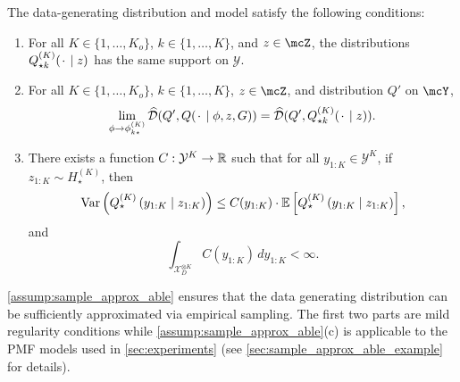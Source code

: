 \begin{assumption}\label{assump:sample_approx_able}
  The data-generating distribution and model satisfy the following conditions: 
	\begin{enumerate}[label={(\alph*)}]
\item For all $K \in \{1,\dots,K_{o}\}$, $k \in \{1,\dots,K\}$, and $z \in \mcZ$, 
the distributions $Q^{(K)}_{\star k}({\mkern 2mu\cdot\mkern 2mu}\mid z)$ has the same support on $\mathcal{Y}$.
    \item For all $K \in \{1,\dots,K_{o}\}$, $k \in \{1,\dots,K\}$, $z \in \mcZ$, and distribution $Q'$ on $\mcY$, 
      \[
        \lim_{{\phi}\to{\phi}^{(K)}_{k\star}}\widehat{\mathcal{D}}(Q', Q({\mkern 2mu\cdot\mkern 2mu}\mid{\phi}, z, G))
        = \widehat{\mathcal{D}}(Q', Q^{(K)}_{\star k}({\mkern 2mu\cdot\mkern 2mu}\mid z)).
      \]
    \item There exists a function $C: \mathcal{Y}^{K} \to \mathbb{R}$ such that for all ${y}_{1:K}\in\mathcal{Y}^{K}$, if
     $z_{1:K}\sim H^{(K)}_{\star}$, then 
      \[
      	\operatorname{Var}\left(Q^{(K)}_{\star}\left({y}_{1:K}\mid z_{1:K}\right)\right) 
   	 \leq C({y}_{1:K})\cdot\mathbb{E}\left[Q^{(K)}_{\star}\left({y}_{1:K}\mid z_{1:K}\right)\right],
     \]
    and
    \[
    \int_{\mathcal{X}^{\otimes K}_{D}}C({y}_{1:K}) \, d{y}_{1:K} < \infty.
    \]
	\end{enumerate}
\end{assumption}
\cref{assump:sample_approx_able} ensures that the data generating distribution can be sufficiently approximated via empirical sampling. 
The first two parts are mild regularity conditions while \cref{assump:sample_approx_able}(c) is applicable to the PMF models used in \cref{sec:experiments} (see \cref{sec:sample_approx_able_example} for details).


